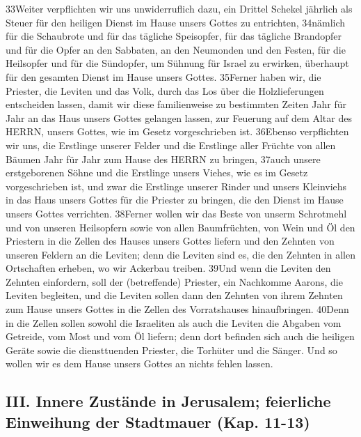 33Weiter verpflichten wir uns unwiderruflich dazu, ein Drittel Schekel
jährlich als Steuer für den heiligen Dienst im Hause unsers Gottes zu
entrichten, 34nämlich für die Schaubrote und für das tägliche
Speisopfer, für das tägliche Brandopfer und für die Opfer an den
Sabbaten, an den Neumonden und den Festen, für die Heilsopfer und für
die Sündopfer, um Sühnung für Israel zu erwirken, überhaupt für den
gesamten Dienst im Hause unsers Gottes. 35Ferner haben wir, die
Priester, die Leviten und das Volk, durch das Los über die
Holzlieferungen entscheiden lassen, damit wir diese familienweise zu
bestimmten Zeiten Jahr für Jahr an das Haus unsers Gottes gelangen
lassen, zur Feuerung auf dem Altar des HERRN, unsers Gottes, wie im
Gesetz vorgeschrieben ist. 36Ebenso verpflichten wir uns, die Erstlinge
unserer Felder und die Erstlinge aller Früchte von allen Bäumen Jahr für
Jahr zum Hause des HERRN zu bringen, 37auch unsere erstgeborenen Söhne
und die Erstlinge unsers Viehes, wie es im Gesetz vorgeschrieben ist,
und zwar die Erstlinge unserer Rinder und unsers Kleinviehs in das Haus
unsers Gottes für die Priester zu bringen, die den Dienst im Hause
unsers Gottes verrichten. 38Ferner wollen wir das Beste von unserm
Schrotmehl und von unseren Heilsopfern sowie von allen Baumfrüchten, von
Wein und Öl den Priestern in die Zellen des Hauses unsers Gottes liefern
und den Zehnten von unseren Feldern an die Leviten; denn die Leviten
sind es, die den Zehnten in allen Ortschaften erheben, wo wir Ackerbau
treiben. 39Und wenn die Leviten den Zehnten einfordern, soll der
(betreffende) Priester, ein Nachkomme Aarons, die Leviten begleiten, und
die Leviten sollen dann den Zehnten von ihrem Zehnten zum Hause unsers
Gottes in die Zellen des Vorratshauses hinaufbringen. 40Denn in die
Zellen sollen sowohl die Israeliten als auch die Leviten die Abgaben vom
Getreide, vom Most und vom Öl liefern; denn dort befinden sich auch die
heiligen Geräte sowie die diensttuenden Priester, die Torhüter und die
Sänger. Und so wollen wir es dem Hause unsers Gottes an nichts fehlen
lassen.

\hypertarget{iii.-innere-zustuxe4nde-in-jerusalem-feierliche-einweihung-der-stadtmauer-kap.-11-13}{%
\subsection{III. Innere Zustände in Jerusalem; feierliche Einweihung der
Stadtmauer (Kap.
11-13)}\label{iii.-innere-zustuxe4nde-in-jerusalem-feierliche-einweihung-der-stadtmauer-kap.-11-13}}

